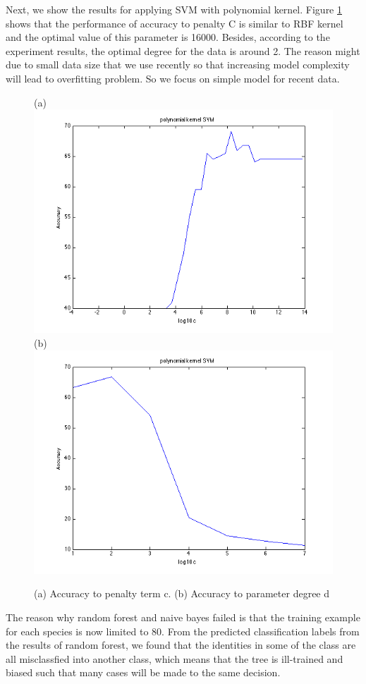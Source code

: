 \documentclass{article} %
\begin{document}
Next, we show the results for applying SVM with polynomial kernel. Figure \ref{fig:poly} shows that the performance of accuracy to penalty C is similar to RBF kernel and the optimal value of this parameter is 16000. Besides, according to the experiment results, the optimal degree for the data is around 2. The reason might due to small data size that we use recently so that increasing model complexity will lead to overfitting problem. So we focus on simple model for recent data.  
 
\begin{figure}[ht!]
    \centering
    {(a)\includegraphics[width=0.45\linewidth]{../Figure/Poly_cost_accuracy.png}
    (b)\includegraphics[width=0.45\linewidth]{../Figure/Poly_degree_accuracy.png}}
    \caption{(a) Accuracy to penalty term c. (b) Accuracy to parameter degree d}
    \label{fig:poly}
\end{figure}

The reason why random forest and naive bayes failed is that the training example for each species is now limited to 80. From the predicted classification labels from the results of random forest, we found that the identities in some of the class are all misclassfied into another class, which means that the tree is ill-trained and biased such that many cases will be made to the same decision. 




\end{document}
